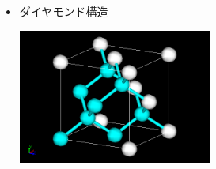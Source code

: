 \documentclass[aspectratio=169,11pt, dvipdfmx]{beamer}
\begin{document}
\begin{frame}
\begin{columns}[totalwidth=\textwidth]
\begin{itemize}
				\item ダイヤモンド構造

				\includegraphics[width=0.5\textwidth]{dia.png}

			\end{itemize}
	\end{columns}
\end{frame}
\end{document}
